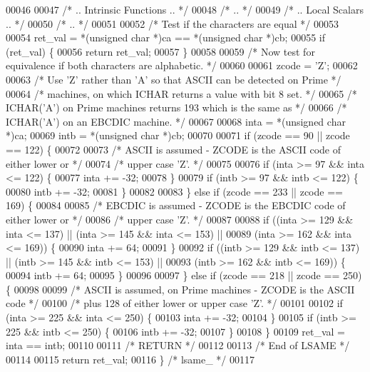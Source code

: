 \begin{DoxyCode}
00046 
00047 \textcolor{comment}{/*     .. Intrinsic Functions .. */}
00048 \textcolor{comment}{/*     .. */}
00049 \textcolor{comment}{/*     .. Local Scalars .. */}
00050 \textcolor{comment}{/*     .. */}
00051 
00052 \textcolor{comment}{/*     Test if the characters are equal */}
00053 
00054     ret\_val = *(\textcolor{keywordtype}{unsigned} \textcolor{keywordtype}{char} *)ca == *(\textcolor{keywordtype}{unsigned} \textcolor{keywordtype}{char} *)cb;
00055     \textcolor{keywordflow}{if} (ret\_val) \{
00056     \textcolor{keywordflow}{return} ret\_val;
00057     \}
00058 
00059 \textcolor{comment}{/*     Now test for equivalence if both characters are alphabetic. */}
00060 
00061     zcode = \textcolor{charliteral}{'Z'};
00062 
00063 \textcolor{comment}{/*     Use 'Z' rather than 'A' so that ASCII can be detected on Prime */}
00064 \textcolor{comment}{/*     machines, on which ICHAR returns a value with bit 8 set. */}
00065 \textcolor{comment}{/*     ICHAR('A') on Prime machines returns 193 which is the same as */}
00066 \textcolor{comment}{/*     ICHAR('A') on an EBCDIC machine. */}
00067 
00068     inta = *(\textcolor{keywordtype}{unsigned} \textcolor{keywordtype}{char} *)ca;
00069     intb = *(\textcolor{keywordtype}{unsigned} \textcolor{keywordtype}{char} *)cb;
00070 
00071     \textcolor{keywordflow}{if} (zcode == 90 || zcode == 122) \{
00072 
00073 \textcolor{comment}{/*        ASCII is assumed - ZCODE is the ASCII code of either lower or */}
00074 \textcolor{comment}{/*        upper case 'Z'. */}
00075 
00076     \textcolor{keywordflow}{if} (inta >= 97 && inta <= 122) \{
00077         inta += -32;
00078     \}
00079     \textcolor{keywordflow}{if} (intb >= 97 && intb <= 122) \{
00080         intb += -32;
00081     \}
00082 
00083     \} \textcolor{keywordflow}{else} \textcolor{keywordflow}{if} (zcode == 233 || zcode == 169) \{
00084 
00085 \textcolor{comment}{/*        EBCDIC is assumed - ZCODE is the EBCDIC code of either lower or */}
00086 \textcolor{comment}{/*        upper case 'Z'. */}
00087 
00088     \textcolor{keywordflow}{if} ((inta >= 129 && inta <= 137) || (inta >= 145 && inta <= 153) || 
00089             (inta >= 162 && inta <= 169)) \{
00090         inta += 64;
00091     \}
00092     \textcolor{keywordflow}{if} ((intb >= 129 && intb <= 137) || (intb >= 145 && intb <= 153) || 
00093             (intb >= 162 && intb <= 169)) \{
00094         intb += 64;
00095     \}
00096 
00097     \} \textcolor{keywordflow}{else} \textcolor{keywordflow}{if} (zcode == 218 || zcode == 250) \{
00098 
00099 \textcolor{comment}{/*        ASCII is assumed, on Prime machines - ZCODE is the ASCII code */}
00100 \textcolor{comment}{/*        plus 128 of either lower or upper case 'Z'. */}
00101 
00102     \textcolor{keywordflow}{if} (inta >= 225 && inta <= 250) \{
00103         inta += -32;
00104     \}
00105     \textcolor{keywordflow}{if} (intb >= 225 && intb <= 250) \{
00106         intb += -32;
00107     \}
00108     \}
00109     ret\_val = inta == intb;
00110 
00111 \textcolor{comment}{/*     RETURN */}
00112 
00113 \textcolor{comment}{/*     End of LSAME */}
00114 
00115     \textcolor{keywordflow}{return} ret\_val;
00116 \} \textcolor{comment}{/* lsame\_ */}
00117 
\end{DoxyCode}
